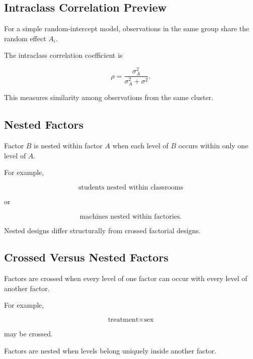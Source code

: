 \subsection{Intraclass Correlation Preview}
\label{subsec:intraclass-correlation-anova}

For a simple random-intercept model, observations in the same group share
the random effect \(A_i\).

The intraclass correlation coefficient is

\[
\boxed{
\rho
=
\frac{
\sigma_A^2
}{
\sigma_A^2+\sigma^2
}.
}
\]

This measures similarity among observations from the same cluster.

\subsection{Nested Factors}
\label{subsec:nested-factors-anova}

Factor \(B\) is nested within factor \(A\) when each level of \(B\)
occurs within only one level of \(A\).

For example,

\[
\boxed{
\text{students nested within classrooms}
}
\]

or

\[
\boxed{
\text{machines nested within factories}.
}
\]

Nested designs differ structurally from crossed factorial designs.

\subsection{Crossed Versus Nested Factors}
\label{subsec:crossed-versus-nested}

Factors are crossed when every level of one factor can occur with every
level of another factor.

For example,

\[
\boxed{
\text{treatment}
\times
\text{sex}
}
\]

may be crossed.

Factors are nested when levels belong uniquely inside another factor.

